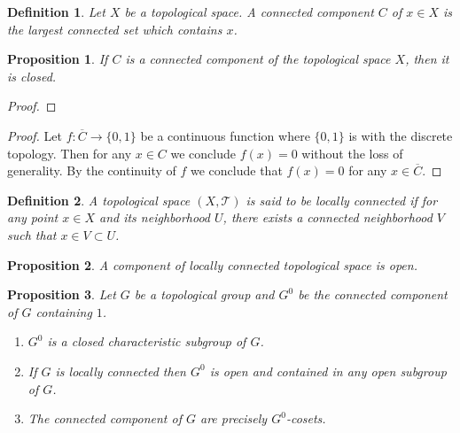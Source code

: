 \documentclass{article}
\newtheorem{proposition}{Proposition}[section]
\newtheorem{definition}{Definition}[section]
\numberwithin{equation}{section}
\begin{document}
\begin{definition}
Let $X$ be a topological space. A connected component $C$ of $x\in X$ is the largest connected set which contains $x$.
\end{definition}

\begin{proposition}
If $C$ is a connected component of the topological space $X$, then it is closed.
\label{comp_clo}
\end{proposition}

\begin{proof}
\end{proof}

\begin{proof}
Let $f:\overline{C}\to\{0,1\}$ be a continuous function where $\{0,1\}$ is  with the discrete topology. Then for any $x\in C$ we conclude $f(x)=0$ without the loss of generality. By the continuity of $f$ we conclude that $f(x)=0$ for any $x\in \overline{C}$. 
\end{proof}

\begin{definition}
A topological space $(X,\mathcal{T})$ is said to be locally connected if for any point $x\in X$ and its neighborhood $U$, there exists a connected neighborhood $V$ such that $x\in V\subset U$.
\end{definition}

\begin{proposition}
A component of locally connected topological space is open.
\label{comp_op_loc}
\end{proposition}

\begin{proposition}
Let $G$ be a topological group and $G^0$ be the connected component of $G$ containing $1$. 
\begin{enumerate}[1)]
\item $G^0$ is a closed characteristic subgroup of $G$.
\item If $G$ is locally connected then $G^0$ is open and contained in any open subgroup of $G$.
\item The connected component of $G$ are precisely $G^0$-cosets.
\end{enumerate}
\end{proposition}
\end{document}

